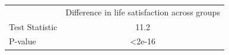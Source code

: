 \begin{tabular}{l c}
\hline
& Difference in life satisfaction across groups \\ 
Test Statistic & 11.2 \\ 
P-value & <2e-16 \\ 
\hline
\end{tabular}
